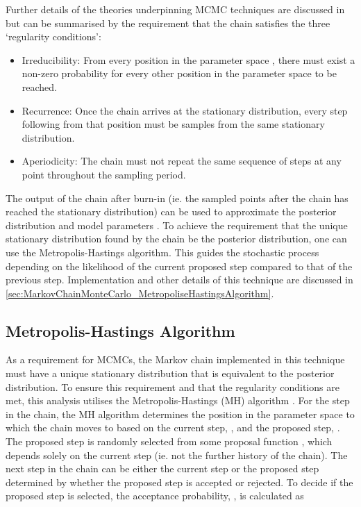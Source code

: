 Further details of the theories underpinning MCMC techniques are discussed in \cite{mcmc_practice} but can be summarised by the requirement that the chain satisfies the three `regularity conditions':

\begin{itemize}
\item Irreducibility: From every position in the parameter space , there must exist a non-zero probability for every other position in the parameter space to be reached.
\item Recurrence: Once the chain arrives at the stationary distribution, every step following from that position must be samples from the same stationary distribution.
\item Aperiodicity: The chain must not repeat the same sequence of steps at any point throughout the sampling period.
\end{itemize}

The output of the chain after burn-in (ie. the sampled points after the chain has reached the stationary distribution) can be used to approximate the posterior distribution and model parameters \quickmath{\vec{\theta}}. To achieve the requirement that the unique stationary distribution found by the chain be the posterior distribution, one can use the Metropolis-Hastings algorithm. This guides the stochastic process depending on the likelihood of the current proposed step compared to that of the previous step. Implementation and other details of this technique are discussed in \autoref{sec:MarkovChainMonteCarlo_MetropoliseHastingsAlgorithm}.

\subsection{Metropolis-Hastings Algorithm}
\label{sec:MarkovChainMonteCarlo_MetropoliseHastingsAlgorithm}

As a requirement for MCMCs, the Markov chain implemented in this technique must have a unique stationary distribution that is equivalent to the posterior distribution. To ensure this requirement and that the regularity conditions are met, this analysis utilises the Metropolis-Hastings (MH) algorithm \cite{metropolis, hastings}. For the  step in the chain, the MH algorithm determines the position in the parameter space to which the chain moves to based on the current step, , and the proposed step, . The proposed step is randomly selected from some proposal function , which depends solely on the current step (ie. not the further history of the chain). The next step in the chain  can be either the current step or the proposed step determined by whether the proposed step is accepted or rejected. To decide if the proposed step is selected, the acceptance probability, , is calculated as


